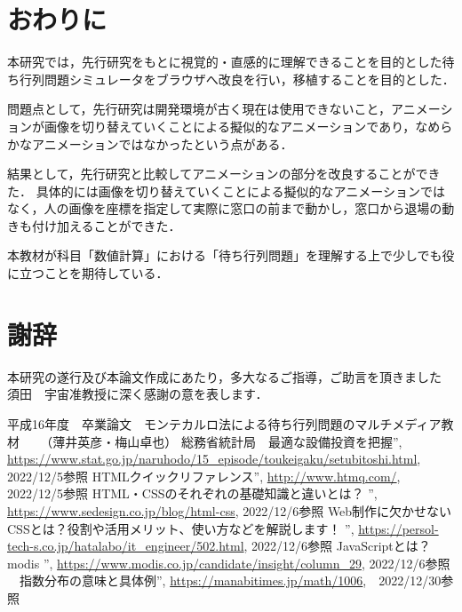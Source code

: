 \documentclass[12pt,a4j]{ltjsarticle}
\begin{document}
\clearpage

\section{おわりに}
本研究では，先行研究をもとに視覚的・直感的に理解できることを目的とした待ち行列問題シミュレータをブラウザへ改良を行い，移植することを目的とした．

問題点として，先行研究は開発環境が古く現在は使用できないこと，アニメーションが画像を切り替えていくことによる擬似的なアニメーションであり，なめらかなアニメーションではなかったという点がある．

結果として，先行研究と比較してアニメーションの部分を改良することができた．
具体的には画像を切り替えていくことによる擬似的なアニメーションではなく，人の画像を座標を指定して実際に窓口の前まで動かし，窓口から退場の動きも付け加えることができた．

本教材が科目「数値計算」における「待ち行列問題」を理解する上で少しでも役に立つことを期待している．

\clearpage

\section{謝辞}
本研究の遂行及び本論文作成にあたり，多大なるご指導，ご助言を頂きました  須田　宇宙准教授に深く感謝の意を表します．
\clearpage

\begin{thebibliography}{99}
	平成16年度　卒業論文　モンテカルロ法による待ち行列問題のマルチメディア教材 　
	（薄井英彦・梅山卓也）
	 総務省統計局　最適な設備投資を把握”, \url{https://www.stat.go.jp/naruhodo/15_episode/toukeigaku/setubitoshi.html}, 2022/12/5参照
	 HTMLクイックリファレンス”, \url{http://www.htmq.com/}, 2022/12/5参照
	HTML・CSSのそれぞれの基礎知識と違いとは？ ”, \url{https://www.sedesign.co.jp/blog/html-css}, 2022/12/6参照
	Web制作に欠かせないCSSとは？役割や活用メリット、使い方などを解説します！ ”, \url{https://persol-tech-s.co.jp/hatalabo/it_engineer/502.html}, 2022/12/6参照
	JavaScriptとは？　modis ”, \url{https://www.modis.co.jp/candidate/insight/column_29}, 2022/12/6参照
	　指数分布の意味と具体例”,  \url{https://manabitimes.jp/math/1006},　2022/12/30参照
\end{thebibliography}
\end{document}
